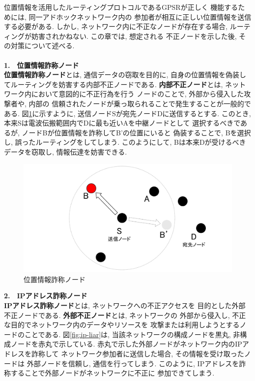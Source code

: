 位置情報を活用したルーティングプロトコルであるGPSRが正しく
機能するためには, 同一アドホックネットワーク内の
参加者が相互に正しい位置情報を送信する必要がある. 
しかし, ネットワーク内に不正なノードが存在する場合, 
ルーティングが妨害されかねない. この章では, 想定される 
不正ノードを示した後, その対策について述べる. \\

\\[0.5em]
\noindent \textbf{1.　位置情報詐称ノード}\\
\indent \textbf{位置情報詐称ノード}とは, 通信データの窃取を目的に, 
自身の位置情報を偽装してルーティングを妨害する内部不正ノードである. 
\textbf{内部不正ノード}とは, ネットワーク内において意図的に不正行為を行う
ノードのことで, 外部から侵入した攻撃者や, 内部の
信頼されたノードが乗っ取られることで発生することが一般的である. 
図\ref{fig:position-liar}に示すように, 送信ノードSが宛先ノードDに送信するとする. 
このとき, 本来Sは電波伝搬範囲内でDに最も近いAを中継ノードとして
選択するべきであるが, ノードBが位置情報を詐称してB'の位置にいると
偽装することで, Bを選択し, 誤ったルーティングをしてしまう. 
このようにして, Bは本来Dが受けるべきデータを窃取し, 
情報伝達を妨害できる.

\begin{figure}
  \centering
  \includegraphics[scale=0.6]{figures/position-liar.png}
  \caption{位置情報詐称ノード}
  \label{fig:position-liar}
\end{figure}

\noindent \textbf{2.　IPアドレス詐称ノード}\\
\indent \textbf{IPアドレス詐称ノード}とは, ネットワークへの不正アクセスを
目的とした外部不正ノードである. \textbf{外部不正ノード}とは, ネットワークの
外部から侵入し, 不正な目的でネットワーク内のデータやリソースを
攻撃または利用しようとするノードのことである. 図\ref{fig:ip-liar}は,  
当該ネットワークの構成ノードを黒丸, 非構成ノードを赤丸で示している. 
赤丸で示した外部ノードがネットワーク内のIPアドレスを詐称して
ネットワーク参加者に送信した場合, その情報を受け取ったノードは
外部ノードを信頼し, 通信を行ってしまう. このように, 
IPアドレスを詐称することで外部ノードがネットワークに不正に
参加できてしまう. 

